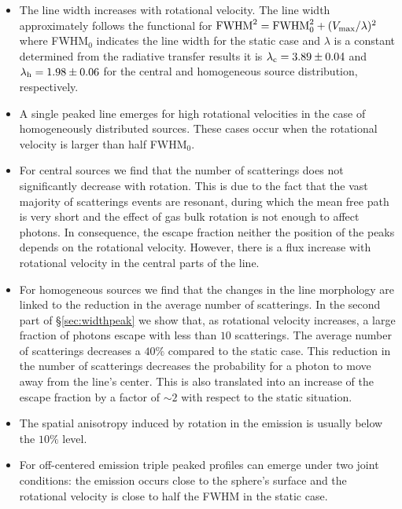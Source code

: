 \documentclass{emulateapj}
\newcommand{\ly}{{\ifmmode{{\rm Ly}\alpha~}\else{Ly$\alpha$~}\fi}}
\begin{document}
\begin{itemize}

\item The line width increases with rotational velocity. The line width
  approximately follows the functional for  ${\rm FWHM}^2 = {\rm FWHM}_{
    0}^2 + (V_{\rm max}/\lambda)^2$ where FWHM$_{0}$ indicates the line
  width for the static case and $\lambda$ is a constant determined from
  the radiative transfer results it is $\lambda_{\rm c}=3.89\pm0.04$ and
  $\lambda_{\rm h}=1.98\pm0.06$ for the central and homogeneous source
  distribution, respectively.


\item A single peaked line emerges for high rotational velocities in
  the case of homogeneously distributed sources. These cases occur when
  the rotational velocity is larger than half FWHM$_0$.  

\item For central sources we find that the number of scatterings
does not significantly decrease with rotation. This is due to the 
fact that the vast majority of scatterings events are resonant, 
during which the mean free path is very short and the effect of gas
bulk rotation is not enough to affect \ly photons. In consequence, 
the escape fraction neither the position of the peaks depends on the
rotational velocity. However, there is a flux increase with rotational
velocity in the central parts of the line.


\item For homogeneous sources we find that the changes in the
line morphology are linked to the reduction in the average number of
scatterings. In the second part of \S \ref{sec:widthpeak} we show
that, as rotational velocity increases, a large fraction of photons
escape with less than $10$ scatterings. The average number of
scatterings decreases a $40\%$ compared to the static case. 
This reduction in the number of scatterings decreases the probability
for a photon to move away from the line's center. This is also
translated into an increase of the escape fraction by a factor of
$\sim 2$ with respect to the static situation.

\item The spatial anisotropy induced by rotation in the emission is
  usually below the $10\%$ level.

\item For off-centered emission triple peaked profiles can emerge
  under two joint conditions: the emission occurs close to the sphere's
  surface and the rotational velocity is close to half the FWHM in the
  static case.   
\end{itemize}
\end{document}
